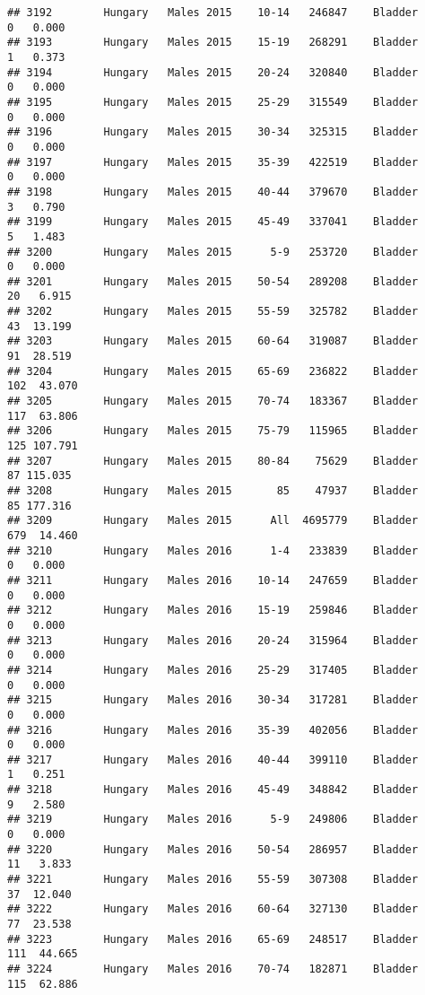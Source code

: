 \documentclass[
]{article}
\begin{document}
\begin{verbatim}
## 3192        Hungary   Males 2015    10-14   246847    Bladder      0   0.000
## 3193        Hungary   Males 2015    15-19   268291    Bladder      1   0.373
## 3194        Hungary   Males 2015    20-24   320840    Bladder      0   0.000
## 3195        Hungary   Males 2015    25-29   315549    Bladder      0   0.000
## 3196        Hungary   Males 2015    30-34   325315    Bladder      0   0.000
## 3197        Hungary   Males 2015    35-39   422519    Bladder      0   0.000
## 3198        Hungary   Males 2015    40-44   379670    Bladder      3   0.790
## 3199        Hungary   Males 2015    45-49   337041    Bladder      5   1.483
## 3200        Hungary   Males 2015      5-9   253720    Bladder      0   0.000
## 3201        Hungary   Males 2015    50-54   289208    Bladder     20   6.915
## 3202        Hungary   Males 2015    55-59   325782    Bladder     43  13.199
## 3203        Hungary   Males 2015    60-64   319087    Bladder     91  28.519
## 3204        Hungary   Males 2015    65-69   236822    Bladder    102  43.070
## 3205        Hungary   Males 2015    70-74   183367    Bladder    117  63.806
## 3206        Hungary   Males 2015    75-79   115965    Bladder    125 107.791
## 3207        Hungary   Males 2015    80-84    75629    Bladder     87 115.035
## 3208        Hungary   Males 2015       85    47937    Bladder     85 177.316
## 3209        Hungary   Males 2015      All  4695779    Bladder    679  14.460
## 3210        Hungary   Males 2016      1-4   233839    Bladder      0   0.000
## 3211        Hungary   Males 2016    10-14   247659    Bladder      0   0.000
## 3212        Hungary   Males 2016    15-19   259846    Bladder      0   0.000
## 3213        Hungary   Males 2016    20-24   315964    Bladder      0   0.000
## 3214        Hungary   Males 2016    25-29   317405    Bladder      0   0.000
## 3215        Hungary   Males 2016    30-34   317281    Bladder      0   0.000
## 3216        Hungary   Males 2016    35-39   402056    Bladder      0   0.000
## 3217        Hungary   Males 2016    40-44   399110    Bladder      1   0.251
## 3218        Hungary   Males 2016    45-49   348842    Bladder      9   2.580
## 3219        Hungary   Males 2016      5-9   249806    Bladder      0   0.000
## 3220        Hungary   Males 2016    50-54   286957    Bladder     11   3.833
## 3221        Hungary   Males 2016    55-59   307308    Bladder     37  12.040
## 3222        Hungary   Males 2016    60-64   327130    Bladder     77  23.538
## 3223        Hungary   Males 2016    65-69   248517    Bladder    111  44.665
## 3224        Hungary   Males 2016    70-74   182871    Bladder    115  62.886

\end{verbatim}
\end{document}
